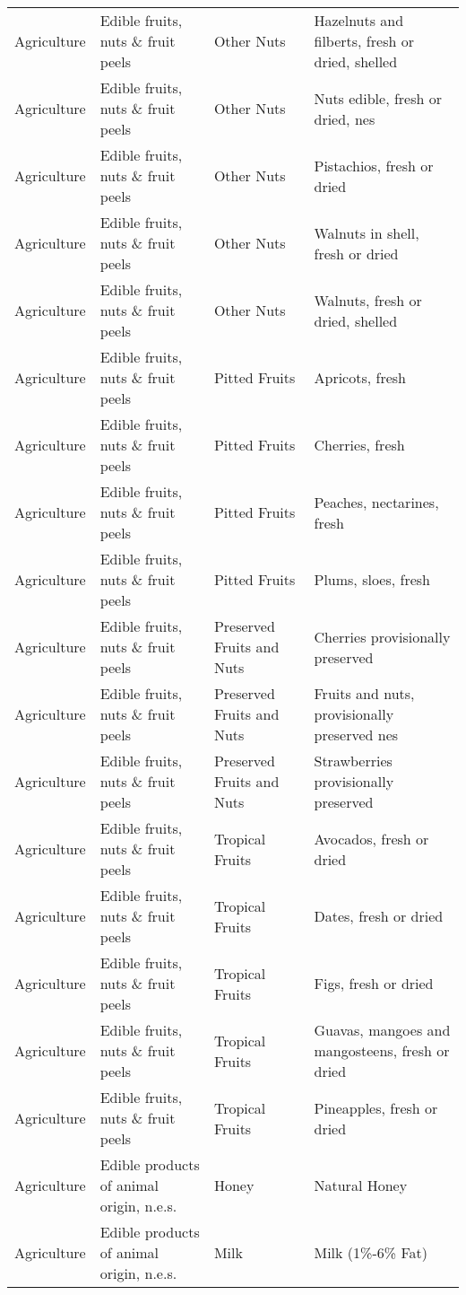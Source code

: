 \begin{appendices}
\begin{xltabular}{\textwidth}{|p{0.07\textwidth}|p{0.28\textwidth}|p{0.24\textwidth}|p{0.31\textwidth}|}
	Agriculture & Edible fruits, nuts \& fruit peels & Other Nuts & Hazelnuts and filberts, fresh or dried, shelled \\
	Agriculture & Edible fruits, nuts \& fruit peels & Other Nuts & Nuts edible, fresh or dried, nes \\
	Agriculture & Edible fruits, nuts \& fruit peels & Other Nuts & Pistachios, fresh or dried \\
	Agriculture & Edible fruits, nuts \& fruit peels & Other Nuts & Walnuts in shell, fresh or dried \\
	Agriculture & Edible fruits, nuts \& fruit peels & Other Nuts & Walnuts, fresh or dried, shelled \\
	Agriculture & Edible fruits, nuts \& fruit peels & Pitted Fruits & Apricots, fresh \\
	Agriculture & Edible fruits, nuts \& fruit peels & Pitted Fruits & Cherries, fresh \\
	Agriculture & Edible fruits, nuts \& fruit peels & Pitted Fruits & Peaches, nectarines, fresh \\
	Agriculture & Edible fruits, nuts \& fruit peels & Pitted Fruits & Plums, sloes, fresh \\
	Agriculture & Edible fruits, nuts \& fruit peels & Preserved Fruits and Nuts & Cherries provisionally preserved \\
	Agriculture & Edible fruits, nuts \& fruit peels & Preserved Fruits and Nuts & Fruits and nuts, provisionally preserved nes \\
	Agriculture & Edible fruits, nuts \& fruit peels & Preserved Fruits and Nuts & Strawberries provisionally preserved \\
	Agriculture & Edible fruits, nuts \& fruit peels & Tropical Fruits & Avocados, fresh or dried \\
	Agriculture & Edible fruits, nuts \& fruit peels & Tropical Fruits & Dates, fresh or dried \\
	Agriculture & Edible fruits, nuts \& fruit peels & Tropical Fruits & Figs, fresh or dried \\
	Agriculture & Edible fruits, nuts \& fruit peels & Tropical Fruits & Guavas, mangoes and mangosteens, fresh or dried \\
	Agriculture & Edible fruits, nuts \& fruit peels & Tropical Fruits & Pineapples, fresh or dried \\
	Agriculture & Edible products of animal origin, n.e.s. & Honey & Natural Honey \\
	Agriculture & Edible products of animal origin, n.e.s. & Milk & Milk (1\%-6\% Fat) \\

\end{xltabular}
\end{appendices}
